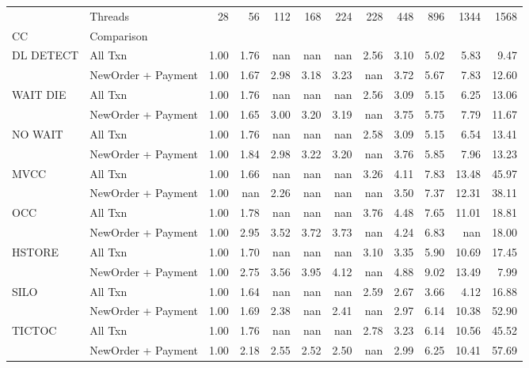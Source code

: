 \begin{tabular}{llrrrrrrrrrr}
\toprule
       & Threads &  28   &  56   &  112  &  168  &  224  &  228  &  448  &  896  &  1344 &  1568 \\
CC & Comparison &       &       &       &       &       &       &       &       &       &       \\
\midrule
DL DETECT & All Txn &  1.00 &  1.76 &   nan &   nan &   nan &  2.56 &  3.10 &  5.02 &  5.83 &  9.47 \\
       & NewOrder + Payment &  1.00 &  1.67 &  2.98 &  3.18 &  3.23 &   nan &  3.72 &  5.67 &  7.83 & 12.60 \\
WAIT DIE & All Txn &  1.00 &  1.76 &   nan &   nan &   nan &  2.56 &  3.09 &  5.15 &  6.25 & 13.06 \\
       & NewOrder + Payment &  1.00 &  1.65 &  3.00 &  3.20 &  3.19 &   nan &  3.75 &  5.75 &  7.79 & 11.67 \\
NO WAIT & All Txn &  1.00 &  1.76 &   nan &   nan &   nan &  2.58 &  3.09 &  5.15 &  6.54 & 13.41 \\
       & NewOrder + Payment &  1.00 &  1.84 &  2.98 &  3.22 &  3.20 &   nan &  3.76 &  5.85 &  7.96 & 13.23 \\
MVCC & All Txn &  1.00 &  1.66 &   nan &   nan &   nan &  3.26 &  4.11 &  7.83 & 13.48 & 45.97 \\
       & NewOrder + Payment &  1.00 &   nan &  2.26 &   nan &   nan &   nan &  3.50 &  7.37 & 12.31 & 38.11 \\
OCC & All Txn &  1.00 &  1.78 &   nan &   nan &   nan &  3.76 &  4.48 &  7.65 & 11.01 & 18.81 \\
       & NewOrder + Payment &  1.00 &  2.95 &  3.52 &  3.72 &  3.73 &   nan &  4.24 &  6.83 &   nan & 18.00 \\
HSTORE & All Txn &  1.00 &  1.70 &   nan &   nan &   nan &  3.10 &  3.35 &  5.90 & 10.69 & 17.45 \\
       & NewOrder + Payment &  1.00 &  2.75 &  3.56 &  3.95 &  4.12 &   nan &  4.88 &  9.02 & 13.49 &  7.99 \\
SILO & All Txn &  1.00 &  1.64 &   nan &   nan &   nan &  2.59 &  2.67 &  3.66 &  4.12 & 16.88 \\
       & NewOrder + Payment &  1.00 &  1.69 &  2.38 &   nan &  2.41 &   nan &  2.97 &  6.14 & 10.38 & 52.90 \\
TICTOC & All Txn &  1.00 &  1.76 &   nan &   nan &   nan &  2.78 &  3.23 &  6.14 & 10.56 & 45.52 \\
       & NewOrder + Payment &  1.00 &  2.18 &  2.55 &  2.52 &  2.50 &   nan &  2.99 &  6.25 & 10.41 & 57.69 \\
\bottomrule
\end{tabular}
